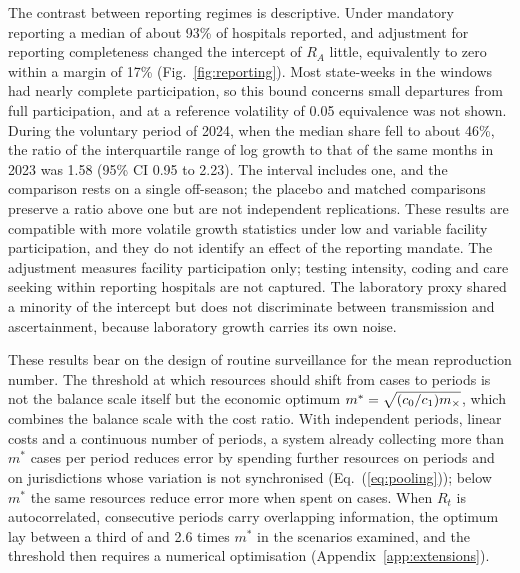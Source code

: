 The contrast between reporting regimes is descriptive. Under mandatory reporting a median of about 93\% of hospitals reported, and adjustment for reporting completeness changed the intercept of $R_A$ little, equivalently to zero within a margin of 17\% (Fig.~\ref{fig:reporting}). Most state-weeks in the windows had nearly complete participation, so this bound concerns small departures from full participation, and at a reference volatility of 0.05 equivalence was not shown. During the voluntary period of 2024, when the median share fell to about 46\%, the ratio of the interquartile range of log growth to that of the same months in 2023 was 1.58 (95\% CI 0.95 to 2.23). The interval includes one, and the comparison rests on a single off-season; the placebo and matched comparisons preserve a ratio above one but are not independent replications. These results are compatible with more volatile growth statistics under low and variable facility participation, and they do not identify an effect of the reporting mandate. The adjustment measures facility participation only; testing intensity, coding and care seeking within reporting hospitals are not captured. The laboratory proxy shared a minority of the intercept but does not discriminate between transmission and ascertainment, because laboratory growth carries its own noise.

These results bear on the design of routine surveillance for the mean reproduction number. The threshold at which resources should shift from cases to periods is not the balance scale itself but the economic optimum $m^*=\sqrt{(c_0/c_1)m_{\times}}$, which combines the balance scale with the cost ratio. With independent periods, linear costs and a continuous number of periods, a system already collecting more than $m^*$ cases per period reduces error by spending further resources on periods and on jurisdictions whose variation is not synchronised (Eq.~(\ref{eq:pooling})); below $m^*$ the same resources reduce error more when spent on cases. When $R_t$ is autocorrelated, consecutive periods carry overlapping information, the optimum lay between a third of and 2.6 times $m^*$ in the scenarios examined, and the threshold then requires a numerical optimisation (Appendix~\ref{app:extensions}).

